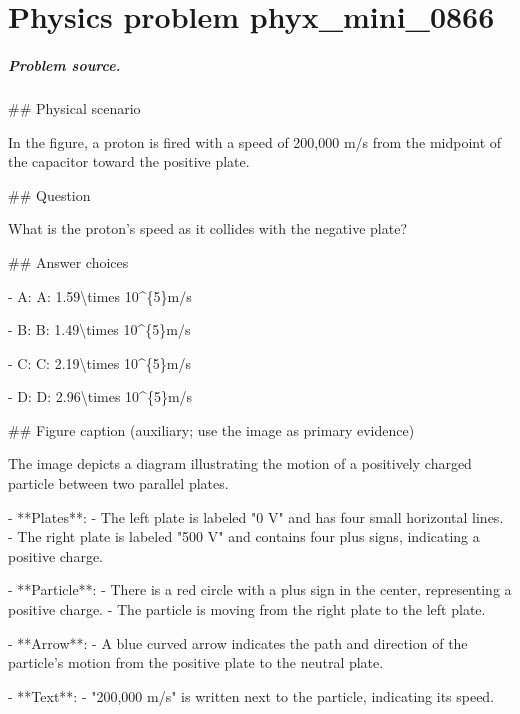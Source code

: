 
\chapter{Physics problem phyx\_mini\_0866}
\label{ch:PhyXMiniProblems_problem_phyx_mini_0866}

\paragraph{Problem source.}
\#\# Physical scenario

In the figure, a proton is fired with a speed of 200,000 m/s from the midpoint of the capacitor toward the positive plate.

\#\# Question

What is the proton’s speed as it collides with the negative plate?

\#\# Answer choices

- A: A: 1.59\textbackslash{}times 10\textasciicircum{}\{5\}m/s

- B: B: 1.49\textbackslash{}times 10\textasciicircum{}\{5\}m/s

- C: C: 2.19\textbackslash{}times 10\textasciicircum{}\{5\}m/s

- D: D: 2.96\textbackslash{}times 10\textasciicircum{}\{5\}m/s

\#\# Figure caption (auxiliary; use the image as primary evidence)

The image depicts a diagram illustrating the motion of a positively charged particle between two parallel plates. 

- **Plates**: 
  - The left plate is labeled "0 V" and has four small horizontal lines.
  - The right plate is labeled "500 V" and contains four plus signs, indicating a positive charge.

- **Particle**: 
  - There is a red circle with a plus sign in the center, representing a positive charge.
  - The particle is moving from the right plate to the left plate.

- **Arrow**:
  - A blue curved arrow indicates the path and direction of the particle's motion from the positive plate to the neutral plate.

- **Text**: 
  - "200,000 m/s" is written next to the particle, indicating its speed.

